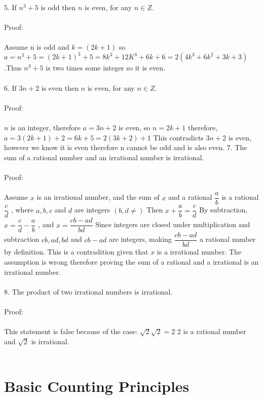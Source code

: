 \documentclass[11pt]{article}
\begin{document}
	5. If $n^3 + 5$ 
is odd then $n$
is even, for any $n \in Z.$ \\\\
Proof: \\\\
Assume n is odd and $k = (2k + 1)$
 so $a = n^3 + 5 = (2k+1)^3 + 5 = 8k^3 + 12K^3 + 6k + 6 = 2(4k^3 + 6k^2 + 3k + 3)$
 .Thus $n^3 + 5$
 is two times some integer so it is even.\\\\
6. If $3n + 2$
is even then $n$
is even, for any $n \in Z.$\\\\
Proof: \\\\
$n$
is an integer, therefore $a = 3n + 2$
is even, so $n = 2k + 1$
therefore, $ a = 3 ( 2k + 1) + 2 = 6k + 5 = 2(3k + 2) + 1$
This contradicts $3n +2$
is even, however we know it is even therefore n cannot be odd and is also even.
	7. The sum of a rational number and an irrational number is irrational. \\\\
Proof: \\\\
Assume $x$ 
is an irrational number, and the sum of $x$
and a rational $\dfrac{a}{b} $
is a rational $\dfrac{c}{d}$
, where $a , b, c $
and $d$
are integers $(b, d \neq )$
Then $ x + \dfrac{a}{b} = \dfrac{c}{d}$
By subtraction, $x = \dfrac{c}{d} - \dfrac{a}{b}$
, and $x = \dfrac{cb - ad}{bd}$
Since integers are closed under multiplication and subtraction $cb, ad, bd$
and $cb -ad$ 
are integers, making $\dfrac{cb-ad}{bd}$
a rational number by definition. This is a contradition given that $x$
is a irrational number. The assumption is wrong therefore proving the sum of a rational and a irrational is an irrational number. \\\\
	8. The product of two irrational numbers is irrational.\\\\
Proof: \\\\
This statement is false because of the case: $\sqrt{2} \sqrt{2} = 2$
2 is a rational number and $\sqrt{2}$
is irrational.\\\\



\section{Basic Counting Principles}
\end{document}
